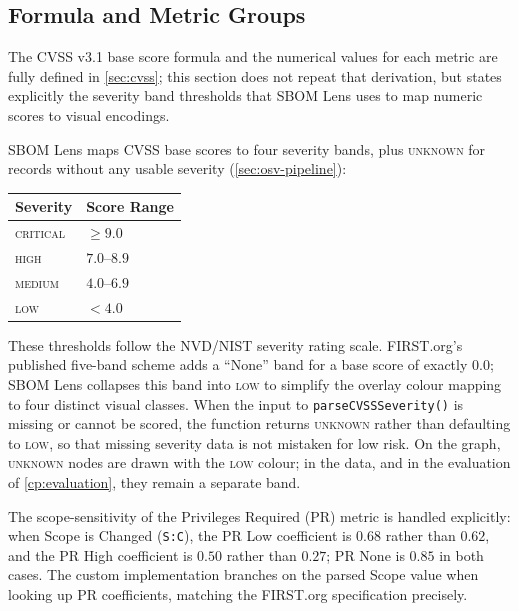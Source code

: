 \subsection{Formula and Metric Groups}
\label{sec:cvss-formula}

The CVSS v3.1 base score formula and the numerical values for each metric are fully defined in \autoref{sec:cvss}; this section does not repeat that derivation, but states explicitly the severity band thresholds that SBOM Lens uses to map numeric scores to visual encodings.

SBOM Lens maps CVSS base scores to four severity bands, plus \textsc{unknown} for records without any usable severity (\autoref{sec:osv-pipeline}):

\begin{center}
    \begin{tabular}{ll}
        \toprule
        \textbf{Severity} & \textbf{Score Range} \\
        \midrule
        \textsc{critical} & \(\geq 9.0\) \\
        \textsc{high} & \(7.0\)--\(8.9\) \\
        \textsc{medium} & \(4.0\)--\(6.9\) \\
        \textsc{low} & \(< 4.0\) \\
        \bottomrule
    \end{tabular}
\end{center}

These thresholds follow the NVD/NIST severity rating scale. FIRST.org's published five-band scheme adds a ``None'' band for a base score of exactly \(0.0\); SBOM Lens collapses this band into \textsc{low} to simplify the overlay colour mapping to four distinct visual classes. When the input to \texttt{parseCVSSSeverity()} is missing or cannot be scored, the function returns \textsc{unknown} rather than defaulting to \textsc{low}, so that missing severity data is not mistaken for low risk. On the graph, \textsc{unknown} nodes are drawn with the \textsc{low} colour; in the data, and in the evaluation of \autoref{cp:evaluation}, they remain a separate band.

The scope-sensitivity of the Privileges Required (PR) metric is handled explicitly: when Scope is Changed (\texttt{S:C}), the PR Low coefficient is \(0.68\) rather than \(0.62\), and the PR High coefficient is \(0.50\) rather than \(0.27\); PR None is \(0.85\) in both cases. The custom implementation branches on the parsed Scope value when looking up PR coefficients, matching the FIRST.org specification precisely.


